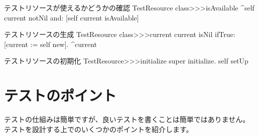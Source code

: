 \documentclass[a4paper,10pt,twoside]{book}
\begin{document}

\begin{method}[testresourceisavailable]{テストリソースが使えるかどうかの確認}
TestResource class>>>isAvailable
	^self current notNil and: [self current isAvailable]
\end{method}
\begin{method}[testresourcecurrent]{テストリソースの生成}
TestResource class>>>current
	current isNil ifTrue: [current := self new].
	^current
\end{method}
\begin{method}[restresourceinitialize]{テストリソースの初期化}
TestResource>>>initialize
	super initialize.
	self setUp
\end{method}
\section{テストのポイント}

テストの仕組みは簡単ですが、良いテストを書くことは簡単ではありません。
テストを設計する上でのいくつかのポイントを紹介します。
\end{document}
